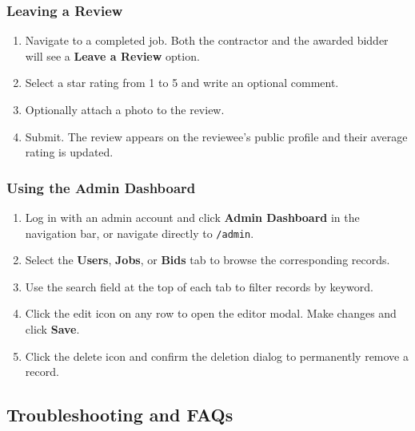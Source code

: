 \documentclass[11pt]{article}
\begin{document}
\subsubsection{Leaving a Review}
\begin{enumerate}[leftmargin=1.8em]
  \item Navigate to a completed job. Both the contractor and the awarded bidder will see a \textbf{Leave a Review} option.
  \item Select a star rating from 1 to 5 and write an optional comment.
  \item Optionally attach a photo to the review.
  \item Submit. The review appears on the reviewee's public profile and their average rating is updated.
\end{enumerate}

\subsubsection{Using the Admin Dashboard}
\begin{enumerate}[leftmargin=1.8em]
  \item Log in with an admin account and click \textbf{Admin Dashboard} in the navigation bar, or navigate directly to \texttt{/admin}.
  \item Select the \textbf{Users}, \textbf{Jobs}, or \textbf{Bids} tab to browse the corresponding records.
  \item Use the search field at the top of each tab to filter records by keyword.
  \item Click the edit icon on any row to open the editor modal. Make changes and click \textbf{Save}.
  \item Click the delete icon and confirm the deletion dialog to permanently remove a record.
\end{enumerate}

\subsection{Troubleshooting and FAQs}
\end{document}
